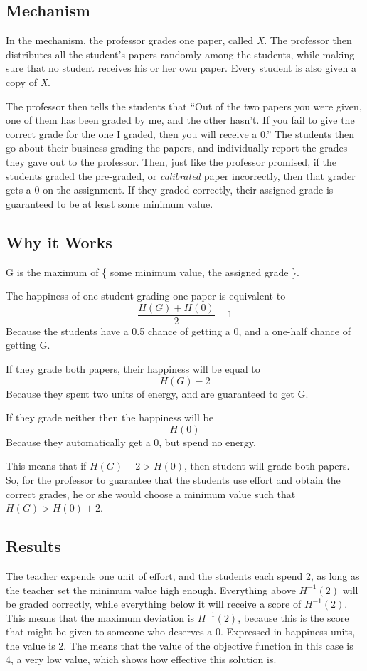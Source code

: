 \documentclass[12pt, Arial]{article}
\begin{document}
\subsection{Mechanism}
In the mechanism, the professor grades one paper, called \emph{X}. The professor then distributes all the student's papers randomly among the students, while making sure that no student receives his or her own paper. Every student is also given a copy of \emph{X}.


The professor then tells the students that ``Out of the two papers you were given, one of them has been graded by me, and the other hasn't. If you fail to give the correct grade for the one I graded, then you will receive a 0.'' The students then go about their business grading the papers, and individually report the grades they gave out to the professor. Then, just like the professor promised, if the students graded the pre-graded, or \emph{calibrated} paper incorrectly, then that grader gets a 0 on the assignment. If they graded correctly, their assigned grade is guaranteed to be at least some minimum value.

\subsection{Why it Works}
G is the maximum of \{ some minimum value, the assigned grade \}.

The happiness of one student grading one paper is equivalent to $$\frac{H(G)+H(0)}{2}-1$$ Because the students have a 0.5 chance of getting a 0, and a one-half chance of getting G.

If they grade both papers, their happiness will be equal to $$H(G)-2$$Because they spent two units of energy, and are guaranteed to get G.

If they grade neither then the happiness will be $$H(0)$$ Because they automatically get a 0, but spend no energy.

This means that if $H(G) - 2 > H(0)$, then student will grade both papers. So, for the professor to guarantee that the students use effort and obtain the correct grades, he or she would choose a minimum value such that $H(G) > H(0) + 2$.
\subsection{Results}
The teacher expends one unit of effort, and the students each spend 2, as long as the teacher set the minimum value high enough.
Everything above $H^{-1}(2)$ will be graded correctly, while everything below it will receive a score of $H^{-1}(2)$.
This means that the maximum deviation is $H^{-1}(2)$, because this is the score that might be given to someone who deserves a 0. Expressed in happiness units, the value is 2.
The means that the value of the objective function in this case is 4, a very low value, which shows how effective this solution is.
\end{document}
